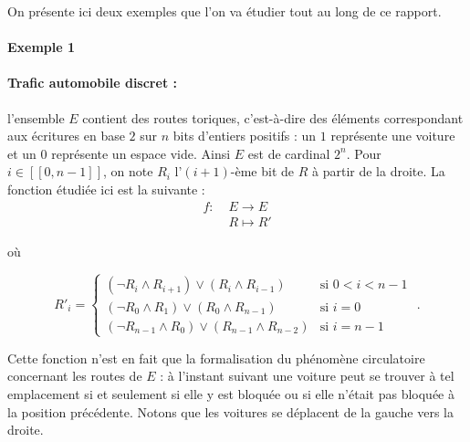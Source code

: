 On pr\'esente ici deux exemples que l'on va \'etudier tout au long de ce rapport.

\paragraph{Exemple 1}

\paragraph{\og Trafic automobile discret\fg{} : }l'ensemble $E$ contient des \og routes \fg{} toriques, c'est-\`a-dire des \'el\'ements correspondant aux \'ecritures en base $2$ sur $n$ bits d'entiers positifs : un $1$ repr\'esente une voiture et un $0$ repr\'esente un espace vide. Ainsi $E$ est de cardinal $2^n$. Pour $i\in [\![0,n-1]\!]$, on note $R_i$ l'$(i+1)$-\`eme bit de $R$ \`a partir de la droite. La fonction \'etudi\'ee ici est la suivante : 
\[\begin{aligned}f:\;&E\rightarrow E\\&R\mapsto R'\end{aligned}\]

o\`u

\[R'_{i}=\begin{cases}(\neg R_{i}\wedge R_{i+1})\vee(R_{i}\wedge R_{i-1}) &\text{si }0<i<n-1\\ (\neg R_{0}\wedge R_{1})\vee(R_{0}\wedge R_{n-1}) &\text{si }i=0\\ (\neg R_{n-1}\wedge R_{0})\vee(R_{n-1}\wedge R_{n-2}) &\text{si }i=n-1\end{cases}\text{ .}\]

Cette fonction n'est en fait que la formalisation du ph\'enom\`ene circulatoire concernant les routes de $E$ : \`a l'instant suivant une voiture peut se trouver \`a tel emplacement si et seulement si elle y est bloqu\'ee ou si elle n'\'etait pas bloqu\'ee \`a la position pr\'ec\'edente. Notons que les voitures se d\'eplacent de la gauche vers la droite.
\par